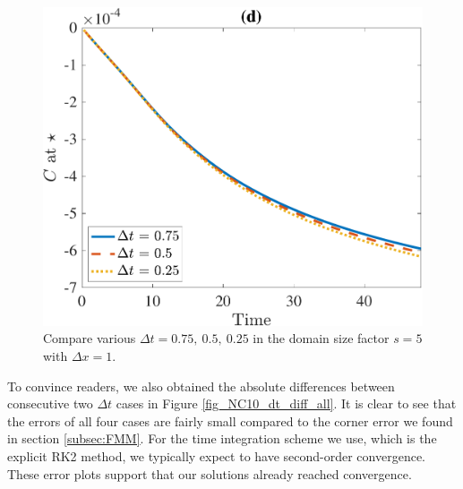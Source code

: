 \begin{figure}[ht]
\begin{center}
		\includegraphics[scale=0.2]{./figures/fig_NC10_dt_C_star}
	\caption{Compare various $\Delta t = 0.75, \ 0.5, \ 0.25$ in the domain size factor $s = 5$ with $\Delta x = 1$.}
	\label{fig_NC10_compare_dt}
\end{center}
\end{figure}
\par
To convince readers, we also obtained the absolute differences between consecutive two $\Delta t$ cases in Figure \ref{fig_NC10_dt_diff_all}.
It is clear to see that the errors of all four cases are fairly small compared to the corner error we found in section \ref{subsec:FMM}. For the time integration scheme we use, which is the explicit RK2 method, we typically expect to have second-order convergence. These error plots support that our solutions already reached convergence.
